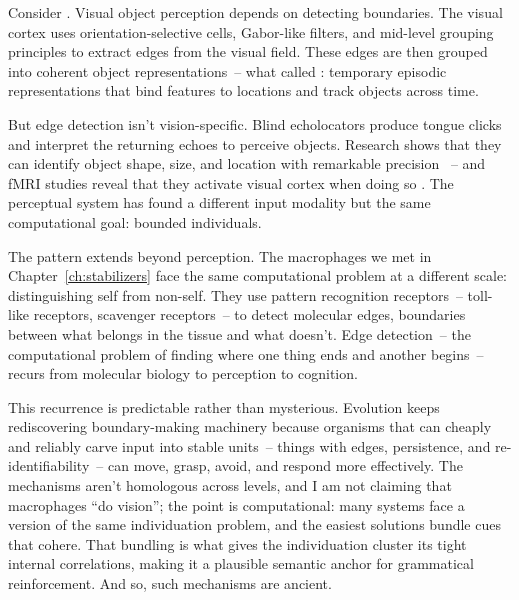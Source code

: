 Consider . Visual object perception depends on detecting boundaries. The visual cortex uses orientation-selective cells, Gabor-like filters, and mid-level grouping principles to extract edges from the visual field. These edges are then grouped into coherent object representations~-- what \textcite{kahneman1992} called : temporary episodic representations that bind features to locations and track objects across time.

But edge detection isn't vision-specific. Blind echolocators produce tongue clicks and interpret the returning echoes to perceive objects. Research shows that they can identify object shape, size, and location with remarkable precision \citep{KolarikEtAl2014}~-- and fMRI studies reveal that they activate visual cortex when doing so \citep{ThalerArnottGoodale2011}. The perceptual system has found a different input modality but the same computational goal: bounded individuals.

The pattern extends beyond perception. The macrophages we met in Chapter~\ref{ch:stabilizers} face the same computational problem at a different scale: distinguishing self from non-self. They use pattern recognition receptors~-- toll-like receptors, scavenger receptors~-- to detect molecular edges, boundaries between what belongs in the tissue and what doesn't. Edge detection~-- the computational problem of finding where one thing ends and another begins~-- recurs from molecular biology to perception to cognition. 

This recurrence is predictable rather than mysterious. Evolution keeps rediscovering boundary-making machinery because organisms that can cheaply and reliably carve input into stable units~-- things with edges, persistence, and re-identifiability~-- can move, grasp, avoid, and respond more effectively. The mechanisms aren't homologous across levels, and I am not claiming that macrophages \enquote{do vision}; the point is computational: many systems face a version of the same individuation problem, and the easiest solutions bundle cues that cohere. That bundling is what gives the individuation cluster its tight internal correlations, making it a plausible semantic anchor for grammatical reinforcement. And so, such mechanisms are ancient. 

